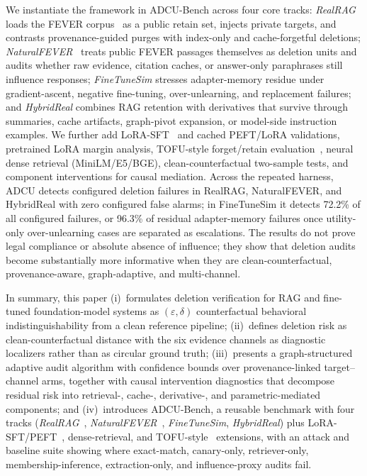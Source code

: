 \documentclass[10pt,journal,compsoc]{IEEEtran}
\newcommand{\method}{ADCU}
\newcommand{\bench}{ADCU-Bench}
\begin{document}
We instantiate the framework in \bench{} across four core tracks: \emph{RealRAG} loads the FEVER corpus~\cite{thorne2018fever} as a public retain set, injects private targets, and contrasts provenance-guided purges with index-only and cache-forgetful deletions; \emph{NaturalFEVER}~\cite{thorne2018fever} treats public FEVER passages themselves as deletion units and audits whether raw evidence, citation caches, or answer-only paraphrases still influence responses; \emph{FineTuneSim} stresses adapter-memory residue under gradient-ascent, negative fine-tuning, over-unlearning, and replacement failures; and \emph{HybridReal} combines RAG retention with derivatives that survive through summaries, cache artifacts, graph-pivot expansion, or model-side instruction examples.
We further add LoRA-SFT~\cite{hu2021lora} and cached PEFT/LoRA validations, pretrained LoRA margin analysis, TOFU-style forget/retain evaluation~\cite{maini2024tofu}, neural dense retrieval (MiniLM/E5/BGE), clean-counterfactual two-sample tests, and component interventions for causal mediation. Across the repeated harness, \method{} detects configured deletion failures in RealRAG, NaturalFEVER, and HybridReal with zero configured false alarms; in FineTuneSim it detects 72.2\% of all configured failures, or 96.3\% of residual adapter-memory failures once utility-only over-unlearning cases are separated as escalations. The results do not prove legal compliance or absolute absence of influence; they show that deletion audits become substantially more informative when they are clean-counterfactual, provenance-aware, graph-adaptive, and multi-channel.

In summary, this paper (i)~formulates deletion verification for RAG and fine-tuned foundation-model systems as $(\varepsilon,\delta)$ counterfactual behavioral indistinguishability from a clean reference pipeline; (ii)~defines deletion risk as clean-counterfactual distance with the six evidence channels as diagnostic localizers rather than as circular ground truth; (iii)~presents a graph-structured adaptive audit algorithm with confidence bounds over provenance-linked target--channel arms, together with causal intervention diagnostics that decompose residual risk into retrieval-, cache-, derivative-, and parametric-mediated components; and (iv)~introduces \bench{}, a reusable benchmark with four tracks (\emph{RealRAG}~\cite{thorne2018fever}, \emph{NaturalFEVER}~\cite{thorne2018fever}, \emph{FineTuneSim}, \emph{HybridReal}) plus LoRA-SFT/PEFT~\cite{hu2021lora}, dense-retrieval, and TOFU-style~\cite{maini2024tofu} extensions, with an attack and baseline suite showing where exact-match, canary-only, retriever-only, membership-inference, extraction-only, and influence-proxy audits fail.
\end{document}
